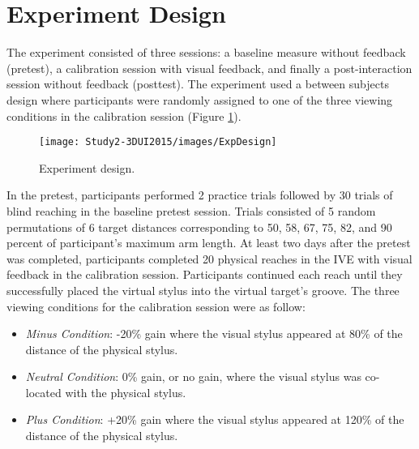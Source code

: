 \section{Experiment Design}
The experiment consisted of three sessions: a baseline measure without feedback (pretest), a calibration session with visual feedback, and finally a post-interaction session without feedback (posttest). The experiment used a between subjects design where participants were randomly assigned to one of the three viewing conditions in the calibration session (Figure \ref{fig:Exp_Design}).

\begin{figure}[ht]
	\centering
	\texttt{[image: Study2-3DUI2015/images/ExpDesign]}
	\vspace{-.5em}
	\caption{Experiment design.}
	\label{fig:Exp_Design}
	
\end{figure}

In the pretest, participants performed 2 practice trials followed by 30 trials of blind reaching in the baseline pretest session. Trials consisted of 5 random permutations of 6 target distances corresponding to 50, 58, 67, 75, 82, and 90 percent of participant's maximum arm length. At least two days after the pretest was completed, participants completed 20 physical reaches in the IVE with visual feedback in the calibration session. Participants continued each reach until they successfully placed the virtual stylus into the virtual target's groove. The three viewing conditions for the calibration session were as follow:
\begin{itemize}
	\item \textit{Minus Condition}: -20\% gain where the visual stylus appeared at 80\% of the distance of the physical stylus.
	\vspace{-.4em}
	\item \textit{Neutral Condition}: 0\% gain, or no gain, where the visual stylus was co-located with the physical stylus.
	\vspace{-.4em}
	\item \textit{Plus Condition}: +20\% gain where the visual stylus appeared at 120\% of the distance of the physical stylus.
\end{itemize}

